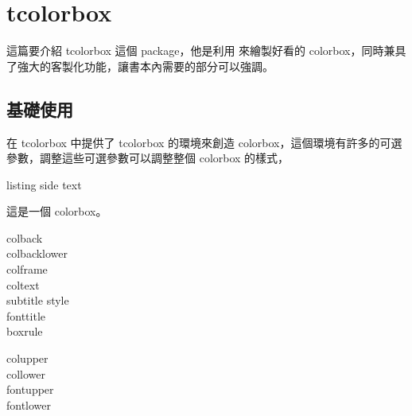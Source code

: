 \chapter{tcolorbox}

這篇要介紹 tcolorbox 這個 package，他是利用 \TikZ 來繪製好看的 colorbox，同時兼具了強大的客製化功能，讓書本內需要的部分可以強調。

\section{基礎使用}

在 tcolorbox 中提供了 tcolorbox 的環境來創造 colorbox，這個環境有許多的可選參數，調整這些可選參數可以調整整個 colorbox 的樣式，

\begin{tcblisting}{listing side text}
\begin{tcolorbox}[colback=gray!30!white, colframe=gray!30!white]
這是一個 colorbox。
\end{tcolorbox}
\end{tcblisting}

\begin{description}
\item[colback]
\item[colbacklower]
\item[colframe]
\item[coltext]
\item[subtitle style]
\item[fonttitle]
\item[boxrule]
\end{description}

\begin{description}
\item[colupper]
\item[collower]
\item[fontupper]
\item[fontlower]
\end{description}


